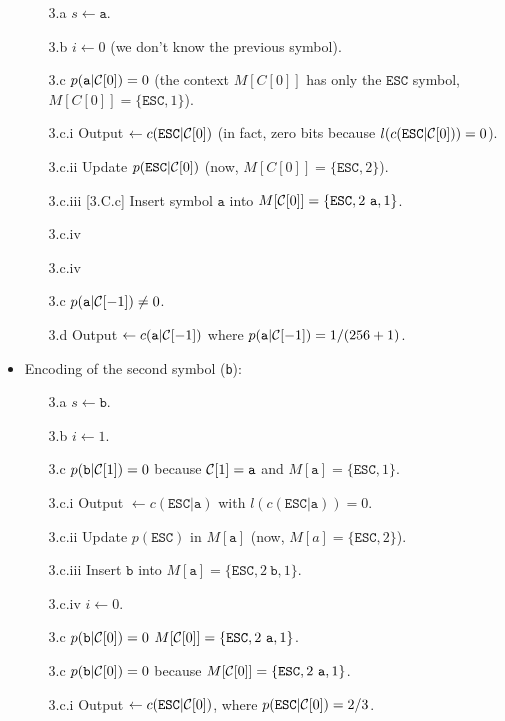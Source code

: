 \begin{itemize}
  \begin{enumerate}
  \item [3.a] $s\leftarrow \mathtt{a}$.
  \item [3.b] $i\leftarrow 0$ (we don't know the previous symbol).
  \item [3.c] $p(\mathtt{a}|{\cal C}[0])=0$ (the context $M[C[0]]$ has only the $\mathtt{ESC}$ symbol, $M[C[0]]=\{\mathtt{ESC},1\}$).
  \item [3.c.i] Output $\leftarrow c(\mathtt{ESC}|{\cal C}[0])$ (in fact, zero bits because 
      $l(c(\mathtt{ESC}|{\cal C}[0]))=0$).
  \item [3.c.ii] Update $p(\mathtt{ESC}|{\cal C}[0])$ (now, $M[C[0]]=\{\mathtt{ESC},2\}$).
  \item [3.c.iii] [3.C.c] Insert symbol $\mathtt{a}$ into
    $M[{\cal C}[0]]=\{\mathtt{ESC},2~\mathtt{a},1\}$.
  \item [3.c.iv] \item [3.c.iv]
  \item [3.c]  $p(\mathtt{a}|{\cal C}[-1])\neq 0$.
  \item [3.d] Output $\leftarrow c(\mathtt{a}|{\cal C}[-1])$ where
    $p(\mathtt{a}|{\cal C}[-1]) = 1/(256+1)$.
  \end{enumerate}
  \item Encoding of the second symbol (\texttt{b}):
  \begin{enumerate}
  \item [3.a] $s\leftarrow \mathtt{b}$.
  \item [3.b] $i\leftarrow 1$.
  \item [3.c] $p(\mathtt{b}|{\cal C}[1])=0$ because ${\cal C}[1]=\mathtt{a}$ and $M[\mathtt{a}]=\{\mathtt{ESC},1\}$.
  \item [3.c.i] Output $\leftarrow c(\mathtt{ESC}|\mathtt{a})$ with $l(c(\mathtt{ESC}|\mathtt{a}))=0$.
  \item [3.c.ii] Update $p(\mathtt{ESC})$ in $M[\mathtt{a}]$ (now, $M[a]=\{\mathtt{ESC},2\}$).
  \item [3.c.iii] Insert $\mathtt{b}$ into $M[\mathtt{a}]=\{\mathtt{ESC},2~ \mathtt{b},1\}$.
  \item [3.c.iv] $i\leftarrow 0$.
  \item [3.c] $p(\mathtt{b}|{\cal C}[0])=0$ $M[{\cal C}[0]]=\{\mathtt{ESC},2~\mathtt{a},1\}$.
  \item [3.c] $p(\mathtt{b}|{\cal C}[0])=0$ because $M[{\cal C}[0]]=\{\mathtt{ESC},2~\mathtt{a},1\}$.
  \item [3.c.i] Output $\leftarrow c(\mathtt{ESC}|{\cal C}[0])$, where $p(\mathtt{ESC}|{\cal C}[0]) = 2/3$.

\end{enumerate}
\end{itemize}
